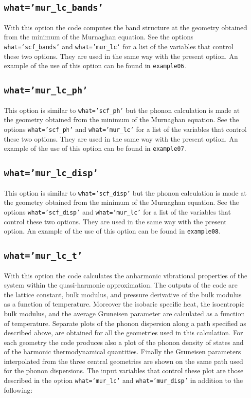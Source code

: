 \documentclass[12pt,a4paper]{article}
\begin{document}
\subsection{\texttt{what='mur\_lc\_bands'}}
With this option the code computes the band structure at the geometry 
obtained from the minimum of the Murnaghan equation. See the options 
\texttt{what='scf\_bands'} and \texttt{what='mur\_lc'} for a list of 
the variables that control these two options. They are used in the same 
way with the present option. An example of the use of this option can be 
found in \texttt{example06}.

\subsection{\texttt{what='mur\_lc\_ph'}}
This option is similar to \texttt{what='scf\_ph'} but the phonon calculation
is made at the geometry obtained from the minimum of the Murnaghan equation.
See the options \texttt{what='scf\_ph'} and \texttt{what='mur\_lc'} for a
list of the variables that control these two options. They are used in
the same way with the present option.
An example of the use of this option can be found in \texttt{example07}.

\subsection{\texttt{what='mur\_lc\_disp'}}
This option is similar to \texttt{what='scf\_disp'} but the phonon calculation
is made at the geometry obtained from the minimum of the Murnaghan equation.
See the options \texttt{what='scf\_disp'} and \texttt{what='mur\_lc'} for a
list of the variables that control these two options. 
They are used in the same way with the present option.
An example of the use of this option can be found in \texttt{example08}.

\subsection{\texttt{what='mur\_lc\_t'}}
With this option the code calculates the anharmonic vibrational
properties of the system within the quasi-harmonic approximation. The
outputs of the code are the lattice constant, bulk modulus, and pressure
derivative of the bulk modulus as a function of temperature. Moreover
the isobaric specific heat, the isoentropic bulk modulus, and the average 
Gruneisen parameter are calculated as a function of temperature. Separate
plots of the phonon dispersion along a path specified as described above,
are obtained for all the geometries used in this calculation. For each
geometry the code produces also a plot of the phonon density of states
and of the harmonic thermodynamical quantities. Finally the Gruneisen
parameters interpolated from the three central geometries are
shown on the same path used for the phonon dispersions. The input variables
that control these plot are those described in the option
\texttt{what='mur\_lc'} and \texttt{what='mur\_disp'} in addition to the 
following:
\end{document}
